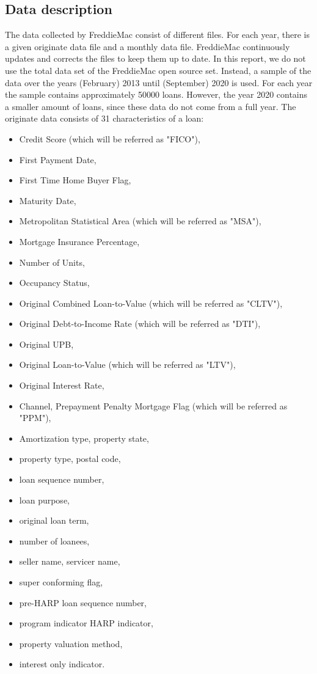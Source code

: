 \subsection{Data description}
    The data collected by FreddieMac consist of different files. 
    For each year, there is a given originate data file and a monthly 
    data file. FreddieMac continuously 
    updates and corrects the files to keep them up to date. 
    In this report, we do not use the total data set of the FreddieMac open source 
    set. 
    Instead, a sample of the data over the years (February) 2013 until (September) 2020 
    is used. For each year the sample contains approximately 50000 loans.
    However, the year 2020 contains a smaller amount of loans, since these data do not come from a full year.
    The originate data consists of 31 characteristics of a loan:
    \begin{itemize}
        \item Credit Score (which will be referred as "FICO"), 
        \item First Payment Date, 
        \item First Time Home Buyer Flag, 
        \item Maturity Date, 
        \item Metropolitan Statistical Area (which will be referred as "MSA"), 
        \item Mortgage Insurance Percentage,
        \item Number of Units, 
        \item Occupancy Status, 
        \item Original Combined Loan-to-Value (which will be referred as "CLTV"), 
        \item Original Debt-to-Income Rate (which will be referred as "DTI"), 
        \item Original UPB, 
        \item Original Loan-to-Value (which will be referred as "LTV"), 
        \item Original Interest Rate, 
        \item Channel, Prepayment Penalty Mortgage Flag 
        (which will be referred as "PPM"), 
        \item Amortization type, property state, 
        \item property type, postal code, 
        \item loan sequence number, 
        \item loan purpose, 
        \item original loan term, 
        \item number of loanees, 
        \item seller name, servicer name, 
        \item super conforming flag, 
        \item pre-HARP loan sequence number, 
        \item program indicator HARP indicator, 
        \item property valuation method,
        \item interest only indicator.
    \end{itemize} 
